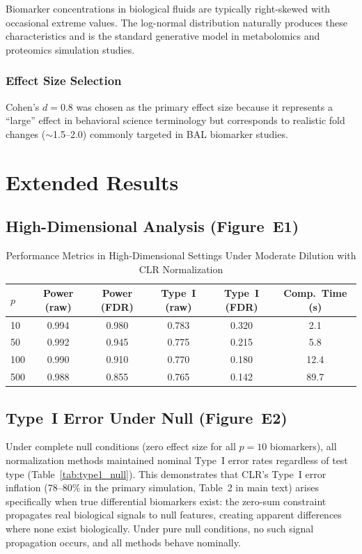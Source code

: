 \documentclass[12pt]{article}
\begin{document}
Biomarker concentrations in biological fluids are typically right-skewed with occasional extreme values. The log-normal distribution naturally produces these characteristics and is the standard generative model in metabolomics and proteomics simulation studies.

\subsubsection{Effect Size Selection}

Cohen's $d = 0.8$ was chosen as the primary effect size because it represents a ``large'' effect in behavioral science terminology but corresponds to realistic fold changes ($\sim$1.5--2.0) commonly targeted in BAL biomarker studies.

\section{Extended Results}

\subsection{High-Dimensional Analysis (Figure~E1)}

\begin{table}[ht!]
\centering
\caption{Performance Metrics in High-Dimensional Settings Under Moderate Dilution with CLR Normalization}
\label{tab:highdim}
\begin{tabular}{lccccc}
\toprule
$p$ & Power (raw) & Power (FDR) & Type~I (raw) & Type~I (FDR) & Comp.\ Time (s) \\
\midrule
10 & 0.994 & 0.980 & 0.783 & 0.320 & 2.1 \\
50 & 0.992 & 0.945 & 0.775 & 0.215 & 5.8 \\
100 & 0.990 & 0.910 & 0.770 & 0.180 & 12.4 \\
500 & 0.988 & 0.855 & 0.765 & 0.142 & 89.7 \\
\bottomrule
\end{tabular}
\end{table}

\subsection{Type~I Error Under Null (Figure~E2)}

Under complete null conditions (zero effect size for all $p = 10$ biomarkers), all normalization methods maintained nominal Type~I error rates regardless of test type (Table~\ref{tab:type1_null}). This demonstrates that CLR's Type~I error inflation (78--80\% in the primary simulation, Table~2 in main text) arises specifically when true differential biomarkers exist: the zero-sum constraint propagates real biological signals to null features, creating apparent differences where none exist biologically. Under pure null conditions, no such signal propagation occurs, and all methods behave nominally.
\end{document}
